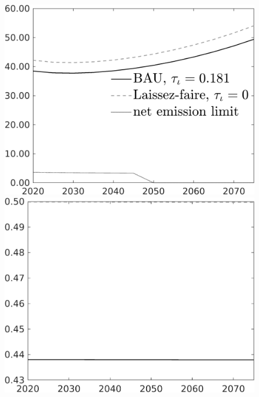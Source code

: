 \documentclass[12pt]{article}
\begin{document}
\begin{figure}[h!!]
\begin{minipage}[]{0.32\textwidth}
	\end{minipage}	
	\begin{minipage}[]{0.32\textwidth}
		\includegraphics[width=1\textwidth]{../../codding_model/own_basedOnFried/optimalPol_010922_revision/figures/all_13Sept22/CompTaul_Equlab_LFBAU_Reg0_Emnet_spillover0_nsk0_xgr1_knspil0_sep1_countec0_GovRev0_etaa0.79_lgd1.png}
	\end{minipage}	
	\begin{minipage}[]{0.32\textwidth}
		\includegraphics[width=1\textwidth]{../../codding_model/own_basedOnFried/optimalPol_010922_revision/figures/all_13Sept22/CompTaul_Equlab_LFBAU_Reg0_hh_spillover0_nsk0_xgr1_knspil0_sep1_countec0_GovRev0_etaa0.79_lgd0.png}

\end{minipage}
\end{figure}
\end{document}
